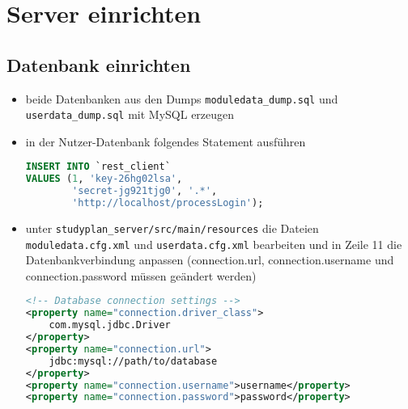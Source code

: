 \section{Server einrichten}
\subsection{Datenbank einrichten}
\begin{itemize}
	\item beide Datenbanken aus den Dumps \texttt{moduledata\_dump.sql} und \texttt{userdata\_dump.sql} mit MySQL erzeugen
	\item in der Nutzer-Datenbank folgendes Statement ausführen 
	\begin{lstlisting}[language=SQL, tabsize=2, basicstyle=\normalfont\ttfamily]
INSERT INTO `rest_client` 
VALUES (1, 'key-26hg02lsa',
		'secret-jg921tjg0', '.*',
		'http://localhost/processLogin');
	\end{lstlisting}
	\item unter \texttt{studyplan\_server/src/main/resources} die Dateien \texttt{moduledata.cfg.xml} und \texttt{userdata.cfg.xml} bearbeiten und in Zeile 11 die Datenbankverbindung anpassen (connection.url, connection.username und connection.password müssen geändert werden)
	\begin{lstlisting}[language=XML, tabsize=2, frame = single, caption={Auszug aus *data.cfg.xml}, captionpos=b, basicstyle=\normalfont\ttfamily]
<!-- Database connection settings -->
<property name="connection.driver_class">
	com.mysql.jdbc.Driver
</property>
<property name="connection.url">
	jdbc:mysql://path/to/database
</property>
<property name="connection.username">username</property>
<property name="connection.password">password</property>
	\end{lstlisting}
\end{itemize}
